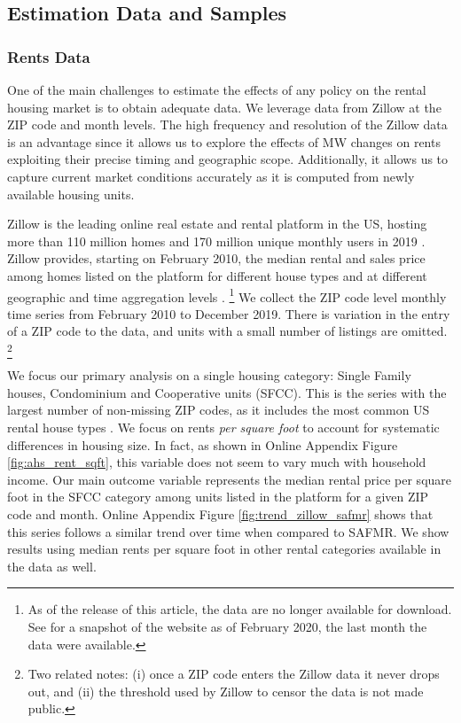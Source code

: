 \subsection{Estimation Data and Samples}

\subsubsection{Rents Data}
\label{sec:data_rents}

One of the main challenges to estimate the effects of any policy on the rental
housing market is to obtain adequate data.
We leverage data from Zillow at the ZIP code and month levels.
The high frequency and resolution of the Zillow data is an advantage since it 
allows us to explore the effects of MW changes on rents exploiting their precise
timing and geographic scope.
Additionally, it allows us to capture current market conditions accurately as it
is computed from newly available housing units.

Zillow is the leading online real estate and rental platform in the US, hosting
more than 110 million homes and 170 million unique monthly users in 2019 
\parencite{ZillowFacts}.
Zillow provides, starting on February 2010, the median rental and sales price 
among homes listed on the platform for different house types and at different 
geographic and time aggregation levels \parencite{ZillowData}.%
\footnote{As of the release of this article, the data are no longer available 
	for download.
	See \textcite{ZillowDataArchive} for a snapshot of the website as of February 
	2020, the last month the data were available.}
We collect the ZIP code level monthly time series from February 2010 to 
December 2019.
There is variation in the entry of a ZIP code to the data, and units with a 
small number of listings are omitted.%
\footnote{Two related notes:
	(i) once a ZIP code enters the Zillow data it never drops out, and
	(ii) the threshold used by Zillow to censor the data is not made public.}

We focus our primary analysis on a single housing category:
Single Family houses, Condominium and Cooperative units (SFCC).
This is the series with the largest number of non-missing ZIP codes, as it 
includes the most common US rental house types \parencite{Fernald2020}.
We focus on rents \textit{per square foot} to account for systematic 
differences in housing size.
In fact, as shown in Online Appendix Figure \ref{fig:ahs_rent_sqft}, this 
variable does not seem to vary much with household income.
Our main outcome variable represents the median rental price per square foot in 
the SFCC category among units listed in the platform for a given ZIP code and 
month.
Online Appendix Figure \ref{fig:trend_zillow_safmr} shows that this series 
follows a similar trend over time when compared to SAFMR.
We show results using median rents per square foot in other rental categories 
available in the data as well.

